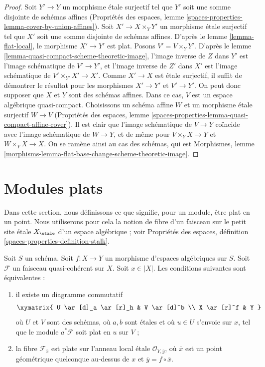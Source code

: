 \begin{proof}
Soit $Y' \to Y$ un morphisme étale surjectif tel que $Y'$ soit une
somme disjointe de schémas affines (Propriétés des espaces,
lemme \ref{spaces-properties-lemma-cover-by-union-affines}).
Soit $X' \to X \times_Y Y'$ un morphisme étale surjectif tel
que $X'$ soit une somme disjointe de schémas affines.
D'après le lemme \ref{lemma-flat-local}, le morphisme $X' \to Y'$ est plat.
Posons $V' = V \times_Y Y'$.
D'après le lemme \ref{lemma-quasi-compact-scheme-theoretic-image},
l'image inverse de $Z$ dans $Y'$ est l'image schématique
de $V' \to Y'$, et l'image inverse de $Z'$ dans $X'$
est l'image schématique de $V' \times_{Y'} X' \to X'$.
Comme $X' \to X$ est étale surjectif, il suffit de démontrer
le résultat pour les morphismes $X' \to Y'$ et $V' \to Y'$.
On peut donc supposer que $X$ et $Y$ sont des schémas affines.
Dans ce cas, $V$ est un espace algébrique quasi-compact.
Choisissons un schéma affine $W$ et un morphisme étale surjectif
$W \to V$ (Propriétés des espaces, lemme
\ref{spaces-properties-lemma-quasi-compact-affine-cover}).
Il est clair que l'image schématique de $V \to Y$
coïncide avec l'image schématique de $W \to Y$, et
de même pour $V \times_Y X \to Y$ et $W \times_Y X \to X$.
On se ramène ainsi au cas des schémas, qui est
Morphismes, lemme
\ref{morphisms-lemma-flat-base-change-scheme-theoretic-image}.
\end{proof}





\section{Modules plats}
\label{section-flat-modules}

\noindent
Dans cette section, nous définissons ce que signifie, pour un module, être plat
en un point. Nous utiliserons pour cela la notion de fibre d'un faisceau sur
le petit site étale $X_\etale$ d'un espace algébrique ; voir
Propriétés des espaces, définition \ref{spaces-properties-definition-stalk}.

\begin{lemma}
\label{lemma-flat-at-point}
Soit $S$ un schéma. Soit $f : X \to Y$ un morphisme d'espaces
algébriques sur $S$. Soit $\mathcal{F}$ un faisceau quasi-cohérent sur $X$.
Soit $x \in |X|$. Les conditions suivantes sont équivalentes :
\begin{enumerate}
\item il existe un diagramme commutatif
$$
\xymatrix{
U \ar[d]_a \ar[r]_h & V \ar[d]^b \\
X \ar[r]^f & Y
}
$$
où $U$ et $V$ sont des schémas, où $a, b$ sont étales et où
$u \in U$ s'envoie sur $x$, tel que le module $a^*\mathcal{F}$ soit plat en $u$ sur $V$ ;
\item la fibre $\mathcal{F}_{\overline{x}}$ est plate sur
l'anneau local étale $\mathcal{O}_{Y, \overline{y}}$,
où $\overline{x}$ est un point géométrique quelconque au-dessus de
$x$ et $\overline{y} = f \circ \overline{x}$.
\end{enumerate}
\end{lemma}

